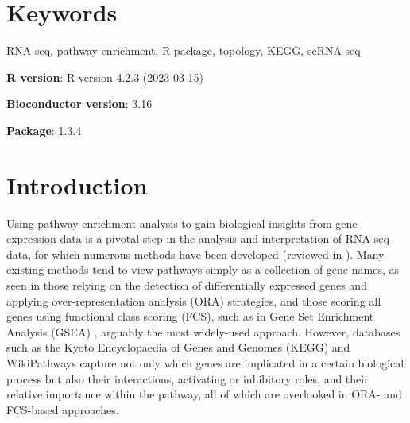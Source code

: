 \documentclass[9pt,a4paper,]{extarticle}
\begin{document}
\section*{Keywords}
RNA-seq, pathway enrichment, R package, topology, KEGG, scRNA-seq


\clearpage
\pagestyle{main}

\textbf{R version}: R version 4.2.3 (2023-03-15)

\textbf{Bioconductor version}: 3.16

\textbf{Package}: 1.3.4

\hypertarget{introduction}{%
\section{Introduction}\label{introduction}}

Using pathway enrichment analysis to gain biological insights from gene expression data is a pivotal step in the analysis and interpretation of RNA-seq data, for which numerous methods have been developed (reviewed in \citep{Maleki2020-ur, Mubeen2022-eq}).
Many existing methods tend to view pathways simply as a collection of gene names, as seen in those relying on the detection of differentially expressed genes and applying over-representation analysis (ORA) strategies, and those scoring all genes using functional class scoring (FCS), such as in Gene Set Enrichment Analysis (GSEA) \citep{Subramanian2005-lx}, arguably the most widely-used approach.
However, databases such as the Kyoto Encyclopaedia of Genes and Genomes (KEGG)\citep{OgataKEGGKyotoEncyclopediaa} and WikiPathways\citep{Martens2021} capture not only which genes are implicated in a certain biological process but also their interactions, activating or inhibitory roles, and their relative importance within the pathway, all of which are overlooked in ORA- and FCS-based approaches.
\end{document}
